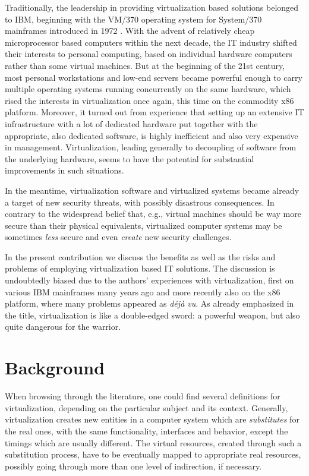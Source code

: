 \documentclass[11pt,a4paper]{llncs}
\begin{document}
Traditionally, the leadership in providing virtualization based solutions 
belonged to IBM, beginning with the VM/370 operating system for System/370 
mainframes introduced in 1972 \cite{IBMJRD25_483}. 
With the advent of relatively cheap microprocessor based computers within 
the next decade, the IT industry shifted their interests to personal computing,
based on individual hardware computers rather than some virtual machines.
But at the beginning of the 21st century, most personal workstations and
low-end servers became powerful enough to carry multiple operating systems 
running concurrently on the same hardware, which rised the interests 
in virtualization once again, this time on the commodity x86 platform. 
Moreover, it turned out from experience that setting up an extensive IT 
infrastructure with a lot of dedicated hardware put together with the 
appropriate, also dedicated software, is highly inefficient and also very 
expensive in management. Virtualization, leading generally to decoupling of 
software from the underlying hardware, seems to have the potential for 
substantial improvements in such situations. 


In the meantime, virtualization software and virtualized systems became 
already a target of new security threats, with possibly disastrous consequences.
In contrary to the widespread belief that, e.g., virtual machines should be way 
more secure than their physical equivalents, virtualized computer systems may 
be sometimes {\em less} secure and even {\em create} new security challenges.


In the present contribution we discuss the benefits as well as the risks and
problems of employing virtualization based IT solutions. 
The discussion is undoubtedly biased due to the authors' experiences with
virtualization, first on various IBM mainframes many years ago and more recently
also on the x86 platform, where many problems appeared as {\em d{\'e}j{\`a} vu}.
As already emphasized in the title, virtualization is like a double-edged 
sword: a powerful weapon, but also quite dangerous for the warrior.



\section{Background}


When browsing through the literature, one could find several definitions for
virtualization, depending on the particular subject and its context. 
Generally, virtualization creates new entities in a computer system which 
are {\em substitutes} for the real ones, with the same functionality, 
interfaces and behavior, except the timings which are usually different.
The virtual resources, created through such a substitution process, have to 
be eventually mapped to appropriate real resources, possibly going through 
more than one level of indirection, if necessary.
\end{document}
